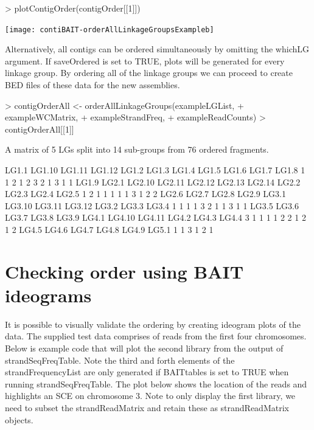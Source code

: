\documentclass{article}
\begin{document}
\begin{Schunk}
\begin{Sinput}
> plotContigOrder(contigOrder[[1]])
\end{Sinput}
\end{Schunk}
\texttt{[image: contiBAIT-orderAllLinkageGroupsExampleb]}

Alternatively, all contigs can be ordered simultaneously by omitting the whichLG argument. If saveOrdered is set to TRUE, plots will be generated for every linkage group.  By ordering all of the linkage groups we can proceed to create BED files of these data for the new assemblies.

\begin{Schunk}
\begin{Sinput}
> contigOrderAll <- orderAllLinkageGroups(exampleLGList,
+ exampleWCMatrix,
+ exampleStrandFreq,
+ exampleReadCounts)
> contigOrderAll[[1]]
\end{Sinput}
\begin{Soutput}
A matrix of 5 LGs split into 14 sub-groups from 76 ordered fragments.

 LG1.1 LG1.10 LG1.11 LG1.12  LG1.2  LG1.3  LG1.4  LG1.5  LG1.6  LG1.7  LG1.8 
     1      1      2      1      2      3      2      1      3      1      1 
 LG1.9  LG2.1 LG2.10 LG2.11 LG2.12 LG2.13 LG2.14  LG2.2  LG2.3  LG2.4  LG2.5 
     1      2      1      1      1      1      1      3      1      2      2 
 LG2.6  LG2.7  LG2.8  LG2.9  LG3.1 LG3.10 LG3.11 LG3.12  LG3.2  LG3.3  LG3.4 
     1      1      1      1      3      2      1      1      3      1      1 
 LG3.5  LG3.6  LG3.7  LG3.8  LG3.9  LG4.1 LG4.10 LG4.11  LG4.2  LG4.3  LG4.4 
     3      1      1      1      1      2      2      1      2      1      2 
 LG4.5  LG4.6  LG4.7  LG4.8  LG4.9  LG5.1 
     1      1      3      1      2      1 
\end{Soutput}
\end{Schunk}


\section{Checking order using BAIT ideograms}

It is possible to visually validate the ordering by creating ideogram plots of the data. The supplied test data comprises of reads from the first four chromosomes. Below is example code that will plot the second library from the output of strandSeqFreqTable. Note the third and forth elements of the strandFrequencyList are only generated if BAITtables is set to TRUE when running strandSeqFreqTable.  The plot below shows the location of the reads and highlights an SCE on chromosome 3. Note to only display the first library, we need to subset the strandReadMatrix and retain these as strandReadMatrix objects.
\end{document}
